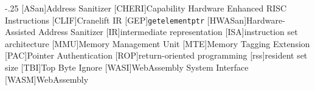 \documentclass[headsepline,footsepline,footinclude=false,oneside,fontsize=11pt,paper=a4,listof=totoc,bibliography=totoc]{scrbook}
\begin{document}
    

    \frontmatter{}

    
    
    
    
    \tableofcontents{}

    \mainmatter{}

    
    
    
    
    
    
    
    
    

    \appendix{}

    


    \begin{acronym}
        \itemsep-.25\baselineskip
        [ASan]{Address Sanitizer}
        [CHERI]{Capability Hardware Enhanced RISC Instructions}
        [CLIF]{Cranelift IR}
        [GEP]{\texttt{getelementptr}}
        [HWASan]{Hardware-Assisted Address Sanitizer}
        [IR]{intermediate representation}
        [ISA]{instruction set architecture}
        [MMU]{Memory Management Unit}
        [MTE]{Memory Tagging Extension}
        [PAC]{Pointer Authentication}
        [ROP]{return-oriented programming}
        [rss]{resident set size}
        [TBI]{Top Byte Ignore}
        [WASI]{WebAssembly System Interface}
        [WASM]{WebAssembly}
    \end{acronym}

    \listoffigures{}
    \listoftables{}
    \printbibliography{}
\end{document}
